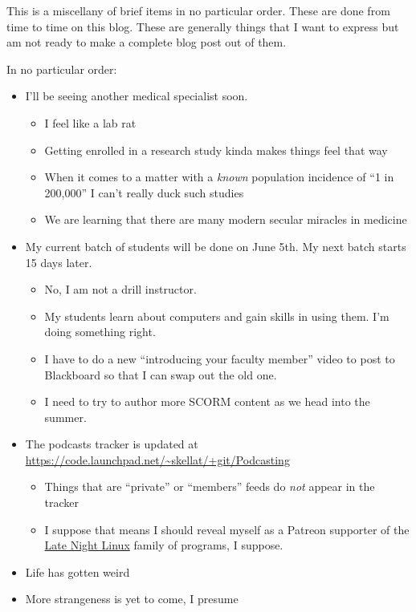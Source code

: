 This is a miscellany of brief items in no particular order. These are
done from time to time on this blog. These are generally things that I
want to express but am not ready to make a complete blog post out of
them.

In no particular order:

\begin{itemize}
\tightlist
\item
  I'll be seeing another medical specialist soon.

  \begin{itemize}
  \tightlist
  \item
    I feel like a lab rat
  \item
    Getting enrolled in a research study kinda makes things feel that
    way
  \item
    When it comes to a matter with a \emph{known} population incidence
    of ``1 in 200,000'' I can't really duck such studies
  \item
    We are learning that there are many modern secular miracles in
    medicine
  \end{itemize}
\item
  My current batch of students will be done on June 5th. My next batch
  starts 15 days later.

  \begin{itemize}
  \tightlist
  \item
    No, I am not a drill instructor.
  \item
    My students learn about computers and gain skills in using them. I'm
    doing something right.
  \item
    I have to do a new ``introducing your faculty member'' video to post
    to Blackboard so that I can swap out the old one.
  \item
    I need to try to author more SCORM content as we head into the
    summer.
  \end{itemize}
\item
  The podcasts tracker is updated at
  \url{https://code.launchpad.net/~skellat/+git/Podcasting}

  \begin{itemize}
  \tightlist
  \item
    Things that are ``private'' or ``members'' feeds do \emph{not}
    appear in the tracker
  \item
    I suppose that means I should reveal myself as a Patreon supporter
    of the \href{https://latenightlinux.com/about/}{Late Night Linux}
    family of programs, I suppose.
  \end{itemize}
\item
  Life has gotten weird
\item
  More strangeness is yet to come, I presume
\end{itemize}
